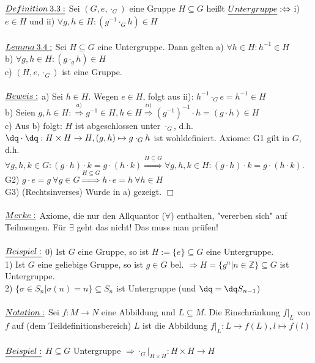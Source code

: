 \documentclass[fleqn, a4paper, 11pt]{article}
\begin{document}
$\uline{Definition\:3.3:}$ Sei $(G,e,\cdot_{G})$ eine Gruppe $H\subseteq G$ hei\ss{}t $\uline{Untergruppe}:\Leftrightarrow$ i) $e\in H$ und ii) $\forall g,h\in H:(g^{-1}\cdot_{G}h)\in H$\\
\\
$\uline{Lemma\:3.4:}$ Sei $H\subseteq G$ eine Untergruppe. Dann gelten a) $\forall h\in H:h^{-1}\in H$\\
b) $\forall g,h\in H:(g\cdot_{g}h)\in H$\\
c) $(H,e,\cdot_{G})$ ist eine Gruppe.\\
\\
$\uline{Beweis:}$ a) Sei $h\in H$. Wegen $e\in H$, folgt aus ii): $h^{-1}\cdot_{G}e=h^{-1}\in H$\\
b) Seien $g,h\in H:\stackrel{a)}{\Rightarrow}g^{-1}\in H,h\in H\stackrel{ii)}{\Rightarrow}(g^{-1})^{-1}\cdot h=(g\cdot h)\in H$\\
c) Aus b) folgt: $H$ ist abgeschlossen unter $\cdot_{G}$, d.h. $\dq\cdot\dq:H\times H\rightarrow H,(g,h)\mapsto g\cdot_{G}h$ ist wohldefiniert. Axiome: G1 gilt in $G$, d.h. $\forall g,h,k\in G:(g\cdot h)\cdot k=g\cdot (h\cdot k)\stackrel{H\subseteq G}{\Rightarrow} \forall g,h,k\in H:(g\cdot h)\cdot k=g\cdot(h\cdot k)$.\\
G2) $g\cdot e=g\:\forall g\in G\stackrel{H\subseteq G}{\Rightarrow} h\cdot e=h\:\forall h\in H$\\
G3) (Rechtsinverses) Wurde in a) gezeigt. \hfill $\Box$\\
\\
$\uline{Merke:}$ Axiome, die nur den Allquantor ($\forall$) enthalten, "vererben sich" auf Teilmengen. F\"ur $\exists$ geht das nicht! Das muss man pr\"ufen!\\
\\
$\uline{Beispiel:}$ 0) Ist $G$ eine Gruppe, so ist $H:=\{e\}\subseteq G$ eine Untergruppe.\\
1) Ist $G$ eine geliebige Gruppe, so ist $g\in G$ bel. $\Rightarrow H=\{g^{n}|n\in\mathbb{Z}\}\subseteq G$ ist Untergruppe.\\
2) $\{\sigma\in S_{n}|\sigma(n)=n\}\subseteq S_{n}$ ist Untergruppe (und $\dq=\dq S_{n-1}$)\\
\\
$\uline{Notation:}$ Sei $f:M\rightarrow N$ eine Abbildung und $L\subseteq M$. Die Einschr\"ankung $f|_{L}$ von $f$ auf (dem Teildefinitionsbereich) $L$ ist die Abbildung $f|_{L}:L\rightarrow f(L),l\mapsto f(l)$\\
\\
$\uline{Beispiel:}$ $H\subseteq G$ Untergruppe $\Rightarrow \cdot_{G}|_{H\times H}:H\times H\rightarrow H$\\
\end{document}
